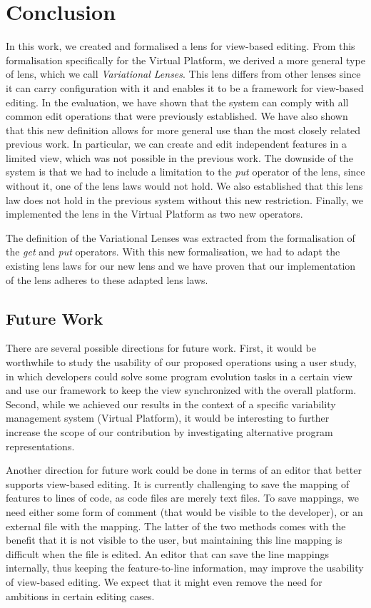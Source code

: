 \chapter{Conclusion}\label{sec:conclusion}
In this work, we created and formalised a lens for view-based editing. From 
this formalisation
specifically for the Virtual Platform, we derived a more general type of lens,
which we call \emph{Variational Lenses}. This lens differs from other lenses
since it can carry configuration with it and enables it to be a framework for
view-based editing. In the evaluation, we have shown that the system
can comply with all common edit operations that were previously established. 
We have also shown that this new definition allows for more general use than 
the most closely related previous work.
In particular, we can create and edit
independent features in a limited view, which was not possible in the previous work. 
The downside of the system is that we had to include a limitation to the 
\emph{put} operator of the lens, since without it, one of the lens laws would
not hold. We also established that this lens law does not hold in the previous
system without this new restriction. Finally, we implemented the lens in the
Virtual Platform as two new operators.

The definition of the Variational Lenses was extracted from the formalisation
of the \emph{get} and \emph{put} operators. With this new formalisation, we had
to adapt the existing lens laws for our new lens and we have proven that our
implementation of the lens adheres to these adapted lens laws.

\section{Future Work}
There are several possible directions for future work. First, it would be worthwhile
to study the usability of our proposed operations using a user study, 
in which developers could solve some program evolution tasks in a certain view and use 
our framework to keep the view synchronized with the overall platform. Second, while 
we achieved our results in the context of a specific variability management system 
(Virtual Platform), it would be interesting to further increase the scope of our 
contribution by investigating alternative program representations.

Another direction for future work could be done in terms of an editor that better
supports view-based editing. It is currently challenging to save the mapping of features
to lines of code, as code files are merely text files. To save mappings, we need either
some form of comment (that would be visible to the developer), or an external file with
the mapping. The latter of the two methods comes with the benefit that it is not visible
to the user, but maintaining this line mapping is difficult when the file is edited. An
editor that can save the line mappings internally, thus keeping the feature-to-line information,
may improve the usability of view-based editing. We expect that it might even remove the need
for ambitions in certain editing cases.
